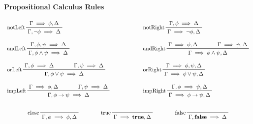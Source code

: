 \documentclass[a4paper, 11pt, accentcolor = tud3b]{tudreport}
\newcommand{\true}{\textbf{true}}
\newcommand{\false}{\textbf{false}}
\begin{document}
				\paragraph{Propositional Calculus Rules}
					\begin{gather*}
						\begin{array}{lcl}
							\prftree[l]{notLeft}{\Gamma \implies \phi, \Delta}{\Gamma, \lnot\phi \implies \Delta} &\quad\quad\quad\quad& \prftree[l]{notRight}{\Gamma, \phi \implies \Delta}{\Gamma \implies \lnot\phi, \Delta} \\\\
							\prftree[l]{andLeft}{\Gamma, \phi, \psi \implies \Delta}{\Gamma, \phi \land \psi \implies \Delta} && \prftree[l]{andRight}{\Gamma \implies \phi, \Delta}{\qquad}{\Gamma \implies \psi, \Delta}{\Gamma \implies \phi \land \psi, \Delta} \\\\
							\prftree[l]{orLeft}{\Gamma, \phi \implies \Delta}{\qquad}{\Gamma, \psi \implies \Delta}{\Gamma, \phi \lor \psi \implies \Delta} && \prftree[l]{orRight}{\Gamma \implies \phi, \psi, \Delta}{\Gamma \implies \phi \lor \psi, \Delta} \\\\
							\prftree[l]{impLeft}{\Gamma \implies \phi, \Delta}{\qquad}{\Gamma, \psi \implies \Delta}{\Gamma, \phi \to \psi \implies \Delta} && \prftree[l]{impRight}{\Gamma, \phi \implies \psi, \Delta}{\Gamma \implies \phi \to \psi, \Delta}
						\end{array} \\\\
						\prftree[l]{close}{\Gamma, \phi \implies \phi, \Delta} \quad\quad\quad\quad \prftree[l]{true}{\Gamma \implies \true, \Delta} \quad\quad\quad\quad \prftree[l]{false}{\Gamma, \false \implies \Delta}
					\end{gather*}
	
\end{document}
